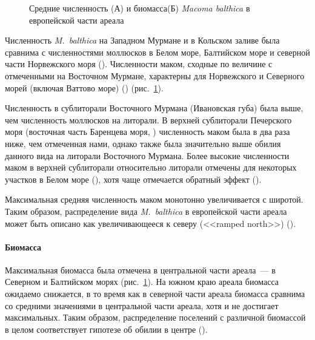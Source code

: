 {{\begin{figure}[]
\begin{minipage}[b]{.5\linewidth}
\begin{center}
			\end{center}
		\end{minipage}
	\caption{Средние численность (А) и биомасса(Б) {\it Macoma balthica} в европейской части ареала}
	\label{ris:NB_areal}
	\end{figure}
Численность {\it M.~balthica} на Западном Мурмане и в Кольском заливе была сравнима с численностями моллюсков в Белом море, Балтийском море и северной части Норвежского моря (\cite{Semenova_1974, Aschan_1988, Maximovich_et_al_1991, Bonsdorff_et_al_1995, Bostrom_Bonsdorff_2000, Oug_2001, Laine_et_al_2003, Khaitov_et_al_2007, Varfolomeeva_Naumov_2013}).
Численности маком, сходные по величине с отмеченными на Восточном Мурмане, характерны для Норвежского и Северного морей (включая Ваттово море) (\cite{Brady_1943, Sneli_1968, Stromgren_et_al_1973, Beukema_1976, Jensen_Jensen_1985, Jensen_et_al_1985, Madsen_Jensen_1987, Beukema_1979, Zwarts_Wanink_1993, Reise_et_al_1994}) (рис.~\ref{ris:NB_areal}).

Численность в сублиторали Восточного Мурмана (Ивановская губа) была выше, чем численность моллюсков на литорали.
В верхней сублиторали Печерского моря (восточная часть Баренцева моря, \cite{Denisenko_et_al_2003}) численность маком была в два раза ниже, чем отмеченная нами, однако также была значительно выше обилия данного вида на литорали Восточного Мурмана.
Более высокие численности маком в верхней сублиторали относительно литорали отмечены для некоторых участков в Белом море (\cite{Semenova_1974}), хотя чаще отмечается обратный эффект (\cite{Semenova_1974, Maximovich_et_al_1991}).

Максимальная средняя численность маком монотонно увеличивается с широтой.
Таким образом, распределение вида {\it M.~balthica} в европейской части ареала может быть описано как увеличивающееся к северу (<<ramped north>>) (\cite{Sagarin_Gaines_2002}).

\paragraph{Биомасса}
Максимальная биомасса была отмечена в центральной части ареала~--- в Северном и Балтийском морях (рис.~\ref{ris:NB_areal}).
На южном краю ареала биомасса ожидаемо снижается, в то время как в северной части ареала биомасса сравнима со средними значениями в центральной части ареала, хотя и не достигает максимальных.
Таким образом, распределение поселений с различной биомассой в целом соответствует гипотезе об обилии в центре (\cite{Sagarin_Gaines_2002}).

}}
